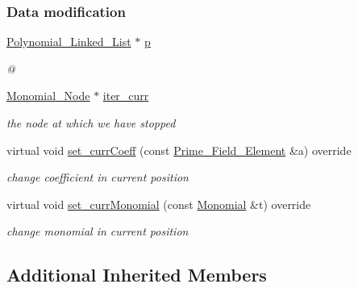 \subsubsection*{Data modification}
\begin{DoxyCompactItemize}
\item 
\hyperlink{group__polygroup_class_polynomial___linked___list}{Polynomial\+\_\+\+Linked\+\_\+\+List} $\ast$ \hyperlink{group___iterator_group_a50151664e42e30b845a0a0d11577cfff}{p}
\begin{DoxyCompactList}\small\item\em @ \end{DoxyCompactList}\item 
\mbox{\label{group___iterator_group_a750f8f8dd1e33b8a7107aa1b717eec72}} 
\hyperlink{group__polygroup_class_monomial___node}{Monomial\+\_\+\+Node} $\ast$ \hyperlink{group___iterator_group_a750f8f8dd1e33b8a7107aa1b717eec72}{iter\+\_\+curr}
\begin{DoxyCompactList}\small\item\em the node at which we have stopped \end{DoxyCompactList}\item 
\mbox{\label{group___iterator_group_a4768fb7fbe060737c964e4179e9102c6}} 
virtual void \hyperlink{group___iterator_group_a4768fb7fbe060737c964e4179e9102c6}{set\+\_\+curr\+Coeff} (const \hyperlink{group___fields_group_class_prime___field___element}{Prime\+\_\+\+Field\+\_\+\+Element} \&a) override
\begin{DoxyCompactList}\small\item\em change coefficient in current position \end{DoxyCompactList}\item 
\mbox{\label{group___iterator_group_abb1e45baaf38bc96bcae22a512135fda}} 
virtual void \hyperlink{group___iterator_group_abb1e45baaf38bc96bcae22a512135fda}{set\+\_\+curr\+Monomial} (const \hyperlink{group__polygroup_class_monomial}{Monomial} \&t) override
\begin{DoxyCompactList}\small\item\em change monomial in current position \end{DoxyCompactList}\end{DoxyCompactItemize}
\subsection*{Additional Inherited Members}


